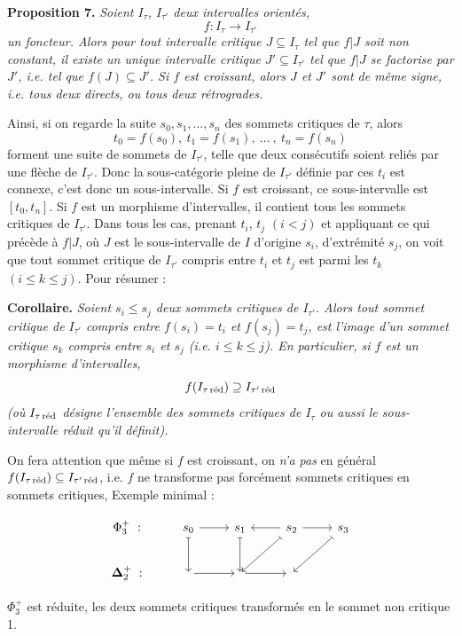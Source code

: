 \documentclass[11pt]{article}
\newcommand{\printedpage}[1]{\if\relax\detokenize{#1}\relax\else\marginpar{\raggedright\footnotesize p.~#1}\fi}
\newcommand{\msp}[1]{\marginpar{\raggedright\footnotesize [#1]}}
\newcommand{\bDelta}{\boldsymbol{\Delta}}
\newcommand{\red}{\text{\upshape réd}}
\begin{document}
\textbf{Proposition 7.} \textit{Soient $I_\tau$, $I_{\tau'}$ deux intervalles orientés,}
\[
f : I_\tau\longrightarrow I_{\tau'}
\]
\textit{un foncteur. Alors pour tout intervalle critique $J\subseteq I_\tau$ tel que $f|J$ soit non constant, il existe un unique intervalle critique $J'\subseteq I_{\tau'}$ tel que $f|J$ se factorise par $J'$, i.e. tel que $f(J)\subseteq J'$. Si $f$ est croissant, alors $J$ et $J'$ sont de même signe,}
\msp{page 34}
\textit{i.e. tous deux directs, ou tous deux rétrogrades.}

Ainsi, si on regarde la suite $s_0,s_1,\ldots,s_n$ des sommets critiques de $\tau$, alors
\[
t_0=f(s_0),\ t_1=f(s_1),\ \ldots\ ,\ t_n=f(s_n)
\]
forment une suite de sommets de $I_{\tau'}$, telle que deux consécutifs soient reliés par une flèche de $I_{\tau'}$. Donc la sous-catégorie pleine de $I_{\tau'}$ définie par ces $t_i$ est connexe, c'est donc un sous-intervalle. Si $f$ est croissant, ce sous-intervalle est $[t_0,t_n]$. Si $f$ est un morphisme d'intervalles, il contient tous les sommets critiques de $I_{\tau'}$. Dans tous les cas, prenant $t_i$, $t_j$ $(i<j)$ et appliquant ce qui précède à $f|J$, où $J$ est le sous-intervalle de $I$ d'origine $s_i$, d'extrémité $s_j$, on voit que tout sommet critique de $I_{\tau'}$ compris entre $t_i$ et $t_j$ est parmi les $t_k$ $(i\leq k\leq j)$. Pour résumer :

\textbf{Corollaire.} \textit{Soient $s_i\leq s_j$ deux sommets critiques de $I_{\tau'}$. Alors tout sommet critique de $I_{\tau'}$ compris entre $f(s_i)=t_i$ et $f(s_j)=t_j$, est l'image d'un sommet critique $s_k$ compris entre $s_i$ et $s_j$ (i.e. $i\leq k\leq j$). En particulier, si $f$ est un morphisme d'intervalles,} %
\[
f(I_{\tau\,\red})\supseteq I_{\tau'\,\red}
\]
\textit{(où $I_{\tau\,\red}$ désigne l'ensemble des sommets critiques de $I_\tau$ ou aussi le sous-intervalle réduit qu'il définit).}

\msp{page 35}
On fera attention que même si $f$ est croissant, on \textit{n'a pas} en général $f(I_{\tau\,\red})\subseteq I_{\tau'\,\red}$, i.e. $f$ ne transforme pas forcément sommets critiques en sommets critiques, Exemple minimal :
\printedpage{23}

\noindent
\begin{minipage}[c]{0.6\textwidth}
\[
\begin{tikzcd}
\Phi_3^+\ : & s_0 \arrow[r] \arrow[d, mapsto] & s_1 \arrow[d, mapsto] & s_2 \arrow[l] \arrow[r] \arrow[dl, mapsto] & s_3 \arrow[dl, mapsto] \\
\bDelta_2^+\ : & {} \arrow[r] & {} \arrow[r] & {} &
\end{tikzcd}
\]
\end{minipage}\hfill
\begin{minipage}[c]{0.35\textwidth}
$\Phi_3^+$ est réduite, les deux sommets critiques transformés en le sommet non critique 1.
\end{minipage}
\end{document}
